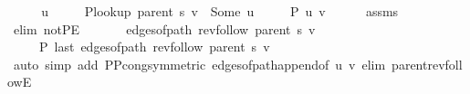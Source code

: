 \begin{isabellebody}
\ {\isacharminus}{\kern0pt}\isanewline
\ \ \isamarkupfalse%
\ u\ \isanewline
\ \ \ \ {\isachardoublequoteopen}P{\isacharunderscore}{\kern0pt}lookup\ {\isacharparenleft}{\kern0pt}parent\ s{\isacharparenright}{\kern0pt}\ v\ {\isacharequal}{\kern0pt}\ Some\ u{\isachardoublequoteclose}\isanewline
\ \ \ \ {\isachardoublequoteopen}{\isasymnot}\ P{\isacharprime}{\kern0pt}{\isacharprime}{\kern0pt}\ {\isacharbraceleft}{\kern0pt}u{\isacharcomma}{\kern0pt}\ v{\isacharbraceright}{\kern0pt}{\isachardoublequoteclose}\isanewline
\ \ \ \ \isamarkupfalse%
\ assms\isanewline
\ \ \ \ \isamarkupfalse%
\ {\isacharparenleft}{\kern0pt}elim\ not{\isacharunderscore}{\kern0pt}P{\isacharprime}{\kern0pt}E{\isacharparenright}{\kern0pt}\isanewline
\ \ \isamarkupfalse%
\isanewline
\ \ \ \ {\isachardoublequoteopen}edges{\isacharunderscore}{\kern0pt}of{\isacharunderscore}{\kern0pt}path\ {\isacharparenleft}{\kern0pt}rev{\isacharunderscore}{\kern0pt}follow\ {\isacharparenleft}{\kern0pt}parent\ s{\isacharparenright}{\kern0pt}\ v{\isacharparenright}{\kern0pt}\ {\isasymnoteq}\ {\isacharbrackleft}{\kern0pt}{\isacharbrackright}{\kern0pt}{\isachardoublequoteclose}\isanewline
\ \ \ \ {\isachardoublequoteopen}{\isasymnot}\ P{\isacharprime}{\kern0pt}{\isacharprime}{\kern0pt}\ {\isacharparenleft}{\kern0pt}last\ {\isacharparenleft}{\kern0pt}edges{\isacharunderscore}{\kern0pt}of{\isacharunderscore}{\kern0pt}path\ {\isacharparenleft}{\kern0pt}rev{\isacharunderscore}{\kern0pt}follow\ {\isacharparenleft}{\kern0pt}parent\ s{\isacharparenright}{\kern0pt}\ v{\isacharparenright}{\kern0pt}{\isacharparenright}{\kern0pt}{\isacharparenright}{\kern0pt}{\isachardoublequoteclose}\isanewline
\ \ \ \ \isamarkupfalse%
\ {\isacharparenleft}{\kern0pt}auto\ simp\ add{\isacharcolon}{\kern0pt}\ P{\isacharunderscore}{\kern0pt}P{\isacharprime}{\kern0pt}{\isacharprime}{\kern0pt}{\isacharunderscore}{\kern0pt}cong{\isacharbrackleft}{\kern0pt}symmetric{\isacharbrackright}{\kern0pt}\ edges{\isacharunderscore}{\kern0pt}of{\isacharunderscore}{\kern0pt}path{\isacharunderscore}{\kern0pt}append{\isacharunderscore}{\kern0pt}{}{\isacharbrackleft}{\kern0pt}of\ {\isachardoublequoteopen}{\isacharbrackleft}{\kern0pt}u{\isacharcomma}{\kern0pt}\ v{\isacharbrackright}{\kern0pt}{\isachardoublequoteclose}{\isacharbrackright}{\kern0pt}\ elim{\isacharcolon}{\kern0pt}\ parent{\isacharunderscore}{\kern0pt}rev{\isacharunderscore}{\kern0pt}followE{\isacharparenright}{\kern0pt}\isanewline
{}\isamarkupfalse%
%
\endisatagproof

\end{isabellebody}
